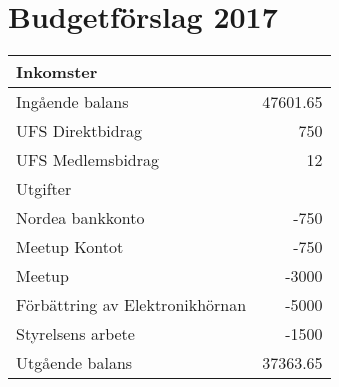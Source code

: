 \documentclass[a4paper,11pt,oneside]{article}
\begin{document}
\section{Budgetförslag 2017}

\begin{tabular}{lr}
  \toprule
  Inkomster & \\
  \midrule
  Ingående balans & 47601.65\\
  UFS Direktbidrag & 750\\
  UFS Medlemsbidrag & 12\\
  \midrule
  Utgifter & \\
  \midrule
  Nordea bankkonto & -750\\
  Meetup Kontot & -750\\
  Meetup & -3000\\
  Förbättring av Elektronikhörnan & -5000\\
  Styrelsens arbete & -1500\\
  \midrule
  Utgående balans & 37363.65\\
  \bottomrule
\end{tabular}
\end{document}
